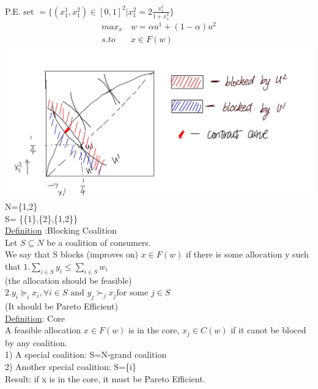 \documentclass[letterpaper,13pt,single,pdftex]{scrartcl}
\begin{document}
P.E. set $= \{ (x_1^1, x_1^2) \in [0,1]^2|x_1^2 = 2\frac{x_1^1}{1+x_1^1}\}$
\begin{align*}
max_x \, &w = \alpha u^1 +(1-\alpha)u^2\\
s.to \quad &x\in F(w)
\end{align*}
\includegraphics[scale = 0.25]{example1.jpg}\\
N=\{1,2\} \\
S= \{\{1\},\{2\},\{1,2\}\}\\
\underline{Definition} :Blocking Coalition\\
Let $S \subseteq N$ be a coalition of consumers. \\
We say that S blocks (improves on) $x \in F(w)$ if there is some allocation y such that
$ 1. \sum\limits_{i \in S} y_i \le \sum\limits_{i \in S} w_i$\\
(the allocation should be feasible)\\
$ 2. y_i \succeq_i x_i, \forall i\in S \text{ and }y_j \succ_j x_j \text{for some }j\in S$\\
(It should be Pareto Efficient)\\
\underline{Definition}: Core\\
A feasible allocation $x\in F(w)$ is in the core, $x_j \in C(w)$ if it canot be bloced by any coalition.\\
1) A special coalition: S=N-grand coalition\\
2) Another special coalition: S=\{i\}\\
Result: if x is in the core, it must be Pareto Efficient. \\
\end{document}
